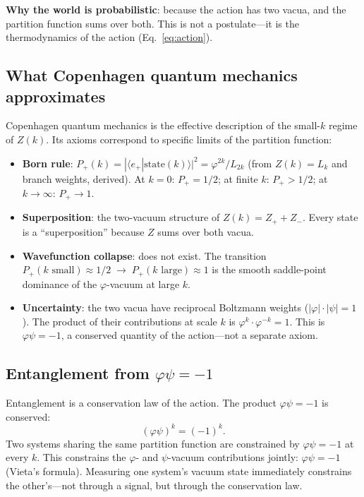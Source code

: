 \documentclass[12pt,a4paper]{article}
\begin{document}
\noindent \textbf{Why the world is probabilistic}: because the action has two vacua, and the partition function sums over both. This is not a postulate---it is the thermodynamics of the action (Eq.~\ref{eq:action}).

\subsection{What Copenhagen quantum mechanics approximates}

Copenhagen quantum mechanics is the effective description of the small-$k$ regime of $Z(k)$. Its axioms correspond to specific limits of the partition function:

\begin{itemize}
\item \textbf{Born rule}: $P_+(k) = |\langle e_+|\mathrm{state}(k)\rangle|^2 = \varphi^{2k}/L_{2k}$ (from $Z(k)=L_k$ and branch weights, derived). At $k=0$: $P_+=1/2$; at finite $k$: $P_+ > 1/2$; at $k \to \infty$: $P_+ \to 1$.
\item \textbf{Superposition}: the two-vacuum structure of $Z(k) = Z_+ + Z_-$. Every state is a ``superposition'' because $Z$ sums over both vacua.
\item \textbf{Wavefunction collapse}: does not exist. The transition $P_+(k\text{ small}) \approx 1/2 \;\to\; P_+(k\text{ large}) \approx 1$ is the smooth saddle-point dominance of the $\varphi$-vacuum at large $k$.
\item \textbf{Uncertainty}: the two vacua have reciprocal Boltzmann weights ($|\varphi| \cdot |\psi| = 1$). The product of their contributions at scale $k$ is $\varphi^k \cdot \varphi^{-k} = 1$. This is $\varphi\psi = -1$, a conserved quantity of the action---not a separate axiom.
\end{itemize}

\subsection{Entanglement from $\varphi\psi = -1$}

Entanglement is a conservation law of the action. The product $\varphi\psi = -1$ is conserved:
\begin{equation}
(\varphi\psi)^k = (-1)^k.
\end{equation}
Two systems sharing the same partition function are constrained by $\varphi\psi = -1$ at every $k$. This constrains the $\varphi$- and $\psi$-vacuum contributions jointly: $\varphi\psi = -1$ (Vieta's formula). Measuring one system's vacuum state immediately constrains the other's---not through a signal, but through the conservation law.
\end{document}
